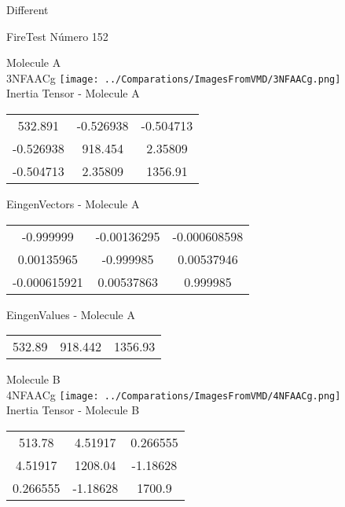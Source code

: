 \begin{center}
\vtab
\vtab
\textcolor{NavyBlue}{\Large Different}
\end{center}

 \newpage

\vtab[-2cm]
\begin{center}
{\large FireTest \tab Número 152}
\end{center}
\begin{multicols}{2}
\begin{center}

Molecule A \\ 
3NFAACg
\texttt{[image: ../Comparations/ImagesFromVMD/3NFAACg.png]}
\\
Inertia Tensor - Molecule A \\
\vtab

\begin{tabular}{|c c c|}
532.891	 & 	-0.526938	 & 	-0.504713	 \\
-0.526938	 & 	918.454	 & 	2.35809	 \\
-0.504713	 & 	2.35809	 & 	1356.91
\end{tabular}

\vtab
 EingenVectors - Molecule A     \\
\vtab
\begin{tabular}{|c c c|}
-0.999999	 & 	-0.00136295	 & 	-0.000608598	 \\
0.00135965	 & 	-0.999985	 & 	0.00537946	 \\
-0.000615921	 & 	0.00537863	 & 	0.999985
\end{tabular}

\vtab
 EingenValues - Molecule A     \\
\vtab
\begin{tabular}{|c c c|}
532.89	 & 	918.442	 & 	1356.93	 \\
\end{tabular}
\columnbreak

Molecule B \\ 
4NFAACg
\texttt{[image: ../Comparations/ImagesFromVMD/4NFAACg.png]}
\\
Inertia Tensor - Molecule B \\
\vtab

\begin{tabular}{|c c c|}
513.78	 & 	4.51917	 & 	0.266555	 \\
4.51917	 & 	1208.04	 & 	-1.18628	 \\
0.266555	 & 	-1.18628	 & 	1700.9
\end{tabular}


\end{center}
\end{multicols}
